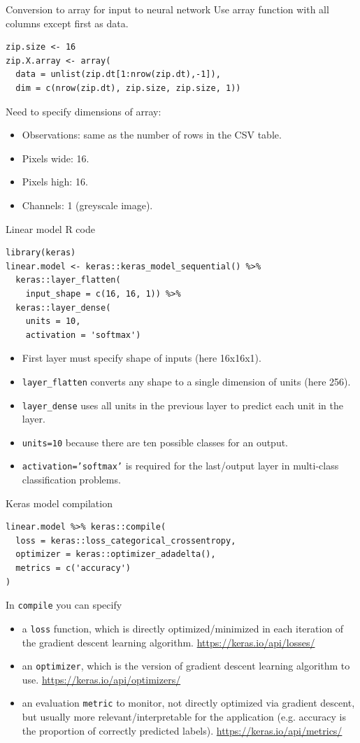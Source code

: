 \documentclass{article}
\begin{document}
{Conversion to array for input to neural network}
Use array function with all columns except first as data.  
\begin{verbatim}
zip.size <- 16
zip.X.array <- array(
  data = unlist(zip.dt[1:nrow(zip.dt),-1]),
  dim = c(nrow(zip.dt), zip.size, zip.size, 1))
\end{verbatim}
Need to specify dimensions of array:
\begin{itemize}
\item Observations: same as the number of rows in the CSV table.
\item Pixels wide: 16.
\item Pixels high: 16.
\item Channels: 1 (greyscale image).
\end{itemize}

{Linear model R code}
\begin{verbatim}
library(keras)
linear.model <- keras::keras_model_sequential() %>%
  keras::layer_flatten(
    input_shape = c(16, 16, 1)) %>%
  keras::layer_dense(
    units = 10,
    activation = 'softmax')
\end{verbatim}
  \begin{itemize}
  \item First layer must specify shape of inputs (here 16x16x1).
  \item \texttt{layer\_flatten} converts any shape to a single dimension
    of units (here 256).
  \item \texttt{layer\_dense} uses all units in the previous layer to
    predict each unit in the layer.
  \item \texttt{units=10} because there are ten possible classes for an output.
  \item \texttt{activation='softmax'} is required for the last/output layer in
    multi-class classification problems.
\end{itemize}

{Keras model compilation}
\begin{verbatim}
linear.model %>% keras::compile(
  loss = keras::loss_categorical_crossentropy,
  optimizer = keras::optimizer_adadelta(),
  metrics = c('accuracy')
)
\end{verbatim}
In \texttt{compile} you can specify
\begin{itemize}
\item a \texttt{loss} function, which is directly optimized/minimized
  in each iteration of the gradient descent learning algorithm. 
  \url{https://keras.io/api/losses/} 
\item an \texttt{optimizer}, which is the version of gradient descent
  learning algorithm to use. 
  \url{https://keras.io/api/optimizers/} 
\item an evaluation \texttt{metric} to monitor, not directly optimized
  via gradient descent, but usually more relevant/interpretable for
  the application (e.g. accuracy is the proportion of correctly
  predicted labels). \url{https://keras.io/api/metrics/} 
\end{itemize}
 
\end{document}
